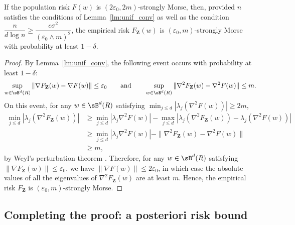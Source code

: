 \documentclass[final,12pt]{colt2018}
\numberwithin{equation}{section}
\numberwithin{equation}{section}
\def\bd#1{\mathbf{#1}}
\def\bZ{\bd{Z}}
\def\eps{\varepsilon}
\begin{document}
\begin{proposition}\label{prop:strongly_Morse} If the population risk $F(w)$ is $(2\eps_0,2m)$-strongly Morse, then, provided $n$ satisfies the conditions of Lemma~\ref{lm:unif_conv} as well as the condition $\dfrac{n}{d\log n} \ge \dfrac{c\sigma^2}{(\eps_0 \wedge m)^2}$, the empirical risk $F_\bZ(w)$ is $(\eps_0,m)$-strongly Morse with probability at least $1-\delta$.
\end{proposition}

\begin{proof} 
By Lemma~\ref{lm:unif_conv}, the following event occurs with probability at least $1-\delta$:
	\begin{align*}
		\sup_{w \in \sB^d(R)} \|\nabla F_\bZ(w)-\nabla F(w)\| \le \eps_0 \qquad \text{and} \qquad
	 \sup_{w \in \sB^d(R)} \| \nabla^2 F_\bZ(w) - \nabla^2 F(w)\| \le m.
	\end{align*}
	On this event, for any $w \in \sB^d(R)$ satisfying $\min_{j \le d}|\lambda_j(\nabla^2 F(w))| \ge 2m$, 
	\begin{align*}
		\min_{j \le d}|\lambda_j(\nabla^2 F_\bZ(w))| &\ge \min_{j \le d}|\lambda_j \nabla^2 F(w)| - \max_{j \le d}|\lambda_j(\nabla^2 F_\bZ(w))-\lambda_j(\nabla^2 F(w))| \nonumber\\
		&\ge \min_{j \le d}|\lambda_j \nabla^2 F(w)|- \| \nabla^2 F_\bZ(w) - \nabla^2 F(w)\| \nonumber\\
		&\ge m,
	\end{align*}
by Weyl's perturbation theorem \citep[Corollary~III.2.6]{Bhatia_matrix_analysis}. Therefore, for any $w \in \sB^d(R)$ satisfying $\|\nabla F_\bZ(w)\| \le \eps_0$, we have $\|\nabla F(w)\| \le 2\eps_0$, in which case the absolute values of all the eigenvalues of $\nabla^2 F_\bZ(w)$ are at least $m$. Hence, the empirical risk $F_\bZ$ is $(\eps_0,m)$-strongly Morse.
\end{proof}

\subsection{Completing the proof: a posteriori risk bound}
\end{document}
